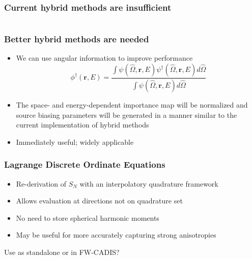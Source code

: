 \documentclass[xcolor=x11names,compress]{beamer}
\renewcommand{\(}{\begin{columns}}
\renewcommand{\)}{\end{columns}}
\newcommand{\<}[1]{\begin{column}{#1}}
\renewcommand{\>}{\end{column}}
\newcommand{\vOmega}{\ensuremath{\hat{\Omega}}}
\newcommand{\ve}[1]{\ensuremath{\mathbf{#1}}}
\begin{document}
\begin{frame}[fragile]
  \frametitle{Current hybrid methods are insufficient}

	\begin{columns}
  	\begin{column}{0.5\textwidth}
 
  	\end{column}
 	\begin{column}{0.5\textwidth}

  	\end{column}
	\end{columns}

\end{frame}

\begin{frame}[fragile]
  \frametitle{Better hybrid methods are needed}

	\begin{itemize}
	\item We can use angular information to improve performance
		\begin{equation}
		\phi^{\dagger}(\ve{r},E) = \frac{\int \psi(\vOmega, \ve{r},E) \psi^{\dagger}(\vOmega, \ve{r},E) d\vOmega}{\int \psi(\vOmega, \ve{r},E)  d\vOmega}
		\end{equation}

	\item The space- and energy-dependent importance map will be normalized and source biasing parameters will be generated in a manner similar to the current implementation of hybrid methods
	\item Immediately useful; widely applicable
	\end{itemize}

\end{frame}


\begin{frame}[fragile]
  \frametitle{Lagrange Discrete Ordinate Equations}

	\begin{itemize}
	\item Re-derivation of $S_N$ with an interpolatory quadrature framework
	\item Allows evaluation at directions not on quadrature set
	\item No need to store spherical harmonic moments
	\item May be useful for more accurately capturing strong anisotropies
	\end{itemize}
	
	Use as standalone or in FW-CADIS?

\end{frame}
\end{document}
